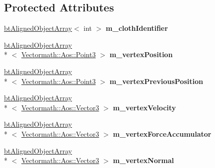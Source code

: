 \subsection*{Protected Attributes}
\begin{DoxyCompactItemize}
\item 
\hypertarget{classbt_soft_body_vertex_data_a82dffaecbdf2212e4271ec67c4721ff5}{\hyperlink{classbt_aligned_object_array}{bt\+Aligned\+Object\+Array}$<$ int $>$ {\bfseries m\+\_\+cloth\+Identifier}}\label{classbt_soft_body_vertex_data_a82dffaecbdf2212e4271ec67c4721ff5}

\item 
\hypertarget{classbt_soft_body_vertex_data_a58ba4336122fb9c9637a086eb8baa463}{\hyperlink{classbt_aligned_object_array}{bt\+Aligned\+Object\+Array}\\*
$<$ \hyperlink{class_vectormath_1_1_aos_1_1_point3}{Vectormath\+::\+Aos\+::\+Point3} $>$ {\bfseries m\+\_\+vertex\+Position}}\label{classbt_soft_body_vertex_data_a58ba4336122fb9c9637a086eb8baa463}

\item 
\hypertarget{classbt_soft_body_vertex_data_a4dde01d320da9b2a5403acce90e64bd0}{\hyperlink{classbt_aligned_object_array}{bt\+Aligned\+Object\+Array}\\*
$<$ \hyperlink{class_vectormath_1_1_aos_1_1_point3}{Vectormath\+::\+Aos\+::\+Point3} $>$ {\bfseries m\+\_\+vertex\+Previous\+Position}}\label{classbt_soft_body_vertex_data_a4dde01d320da9b2a5403acce90e64bd0}

\item 
\hypertarget{classbt_soft_body_vertex_data_ab56e3245c46292bf4621f6316f17e613}{\hyperlink{classbt_aligned_object_array}{bt\+Aligned\+Object\+Array}\\*
$<$ \hyperlink{class_vectormath_1_1_aos_1_1_vector3}{Vectormath\+::\+Aos\+::\+Vector3} $>$ {\bfseries m\+\_\+vertex\+Velocity}}\label{classbt_soft_body_vertex_data_ab56e3245c46292bf4621f6316f17e613}

\item 
\hypertarget{classbt_soft_body_vertex_data_af1e647e767e9bc9c33a472db531bf494}{\hyperlink{classbt_aligned_object_array}{bt\+Aligned\+Object\+Array}\\*
$<$ \hyperlink{class_vectormath_1_1_aos_1_1_vector3}{Vectormath\+::\+Aos\+::\+Vector3} $>$ {\bfseries m\+\_\+vertex\+Force\+Accumulator}}\label{classbt_soft_body_vertex_data_af1e647e767e9bc9c33a472db531bf494}

\item 
\hypertarget{classbt_soft_body_vertex_data_af9ab6e325ae1068aa14a97167499c6da}{\hyperlink{classbt_aligned_object_array}{bt\+Aligned\+Object\+Array}\\*
$<$ \hyperlink{class_vectormath_1_1_aos_1_1_vector3}{Vectormath\+::\+Aos\+::\+Vector3} $>$ {\bfseries m\+\_\+vertex\+Normal}}\label{classbt_soft_body_vertex_data_af9ab6e325ae1068aa14a97167499c6da}


\end{DoxyCompactItemize}
